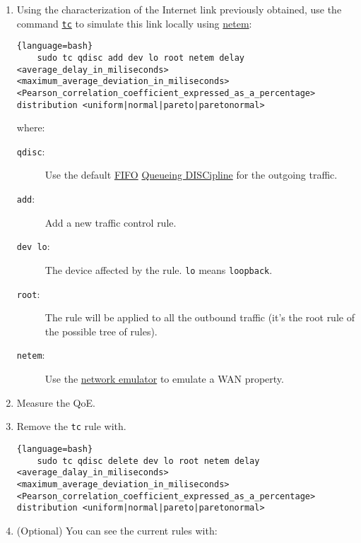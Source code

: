 \begin{enumerate}
  
\item Using the characterization of the Internet link previously
  obtained, use the command
  \href{https://man7.org/linux/man-pages/man8/tc.8.html}{\texttt{tc}}
  to simulate this link locally using
  \href{https://man7.org/linux/man-pages/man8/tc-netem.8.html}{netem}:

  \begin{lstlisting}{language=bash}
    sudo tc qdisc add dev lo root netem delay <average_delay_in_miliseconds> <maximum_average_deviation_in_miliseconds> <Pearson_correlation_coefficient_expressed_as_a_percentage> distribution <uniform|normal|pareto|paretonormal>
  \end{lstlisting}
  where:
  \begin{description}
  \item [\texttt{qdisc}:] Use the default
    \href{https://en.wikipedia.org/wiki/FIFO_(computing_and_electronics)}{FIFO}
    \href{https://wiki.debian.org/TrafficControl}{Queueing DISCipline}
    for the outgoing traffic.
  \item [\texttt{add}:] Add a new traffic control rule.
  \item [\texttt{dev lo}:] The device affected by the
    rule. \texttt{lo} means \texttt{loopback}.
  \item [\texttt{root}:] The rule will be applied to all the outbound
    traffic (it's the root rule of the possible tree of rules).
  \item [\texttt{netem}:] Use the
    \href{https://wiki.linuxfoundation.org/networking/netem}{network
      emulator} to emulate a WAN property.
  \end{description}

\item Measure the QoE.

\item Remove the \texttt{tc} rule with.
  
  \begin{lstlisting}{language=bash}
    sudo tc qdisc delete dev lo root netem delay <average_dalay_in_miliseconds> <maximum_average_deviation_in_miliseconds> <Pearson_correlation_coefficient_expressed_as_a_percentage> distribution <uniform|normal|pareto|paretonormal>
  \end{lstlisting}

\item (Optional) You can see the current rules with:


\end{enumerate}
